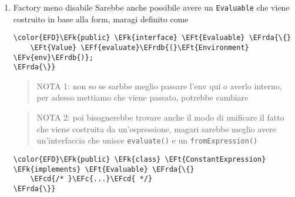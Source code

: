 \documentclass[11pt]{article}
\newcommand{\EFc}[1]{\textcolor{EFc}{#1}} %
\newcommand{\EFcd}[1]{\textcolor{EFcd}{#1}} %
\newcommand{\EFs}[1]{\textcolor{EFs}{#1}} %
\newcommand{\EFk}[1]{\textcolor{EFk}{#1}} %
\newcommand{\EFf}[1]{\textcolor{EFf}{#1}} %
\newcommand{\EFv}[1]{\textcolor{EFv}{#1}} %
\newcommand{\EFt}[1]{\textcolor{EFt}{#1}} %
\newcommand{\EFrda}[1]{\textcolor{EFrda}{#1}} %
\newcommand{\EFrdb}[1]{\textcolor{EFrdb}{#1}} %
\newcommand{\EFrdc}[1]{\textcolor{EFrdc}{#1}} %
\newcommand{\EFrdd}[1]{\textcolor{EFrdd}{#1}} %
\begin{document}
\begin{enumerate}
\begin{enumerate}
\begin{Code}
\begin{Verbatim}
            \EFcd{// }\EFc{NOTA : non mi ricordo come si fa a dire in java "non è nella map"}
            \EFcd{// }\EFc{quando lo trovo te lo metto bellino}
        \EFrdc{\}}
    \EFrdb{\}}

    \EFk{private} \EFt{HasMap} \EFv{opnameEvaluatorMap} =
    \EFrdb{\{}
        \EFrdc{\{}\EFs{"quote"} : \EFk{new} \EFt{QuoteEvaluator}\EFrdd{(}\EFrdd{)}\EFrdc{\}},
        \EFrdc{\{}\EFs{"if"} : \EFk{new} \EFt{IfEvaluator}\EFrdd{(}\EFrdd{)}\EFrdc{\}},
        \EFrdc{\{}\EFs{"set"} : \EFk{new} \EFt{AssignmentEvaluator}\EFrdd{(}\EFrdd{)}\EFrdc{\}},
        \EFrdc{\{}\EFs{"define"} : \EFk{new} \EFt{DefinitionEvaluator}\EFrdd{(}\EFrdd{)}\EFrdc{\}},
        \EFrdc{\{}\EFs{"lambda"} : \EFk{new} \EFt{LambdaEvaluator}\EFrdd{(}\EFrdd{)}\EFrdc{\}},
        \EFrdc{\{}\EFs{"sequence"} : \EFk{new} \EFt{SequenceEvaluator}\EFrdd{(}\EFrdd{)}\EFrdc{\}},
        \EFrdc{\{}\EFs{"cond"} : \EFk{new} \EFt{CondEvaluator}\EFrdd{(}\EFrdd{)}\EFrdc{\}}
    \EFrdb{\}};
\EFrda{\}}
\end{Verbatim}
\end{Code}

Se hai idee migliori di questo factory disabile sarei molto felice di sentirle, io le sto un po' finendo.
\item Factory meno disabile
\label{sec:org37f9f33}
Sarebbe anche possibile avere un \texttt{Evaluable} che viene costruito in base alla form, maragi definito come
\begin{Code}
\begin{Verbatim}
\color{EFD}\EFk{public} \EFk{interface} \EFt{Evaluable} \EFrda{\{}
    \EFt{Value} \EFf{evaluate}\EFrdb{(}\EFt{Environment} \EFv{env}\EFrdb{)};
\EFrda{\}}

\end{Verbatim}
\end{Code}

\begin{quote}
NOTA 1: non so se sarbbe meglio passare l'env qui o averlo interno, per adesso mettiamo che viene passato, potrebbe cambiare
\end{quote}

\begin{quote}
NOTA 2: poi bisognerebbe trovare anche il modo di unificare il fatto che viene costruita da un'espressione, magari sarebbe meglio avere un'interfaccia che unisce \texttt{evaluate()} e un \texttt{fromExpression()}
\end{quote}

\begin{Code}
\begin{Verbatim}
\color{EFD}\EFk{public} \EFk{class} \EFt{ConstantExpression} \EFk{implements} \EFt{Evaluable} \EFrda{\{}
    \EFcd{/* }\EFc{...}\EFcd{ */}
\EFrda{\}}


\end{Verbatim}
\end{Code}
\end{enumerate}
\end{enumerate}
\end{document}
